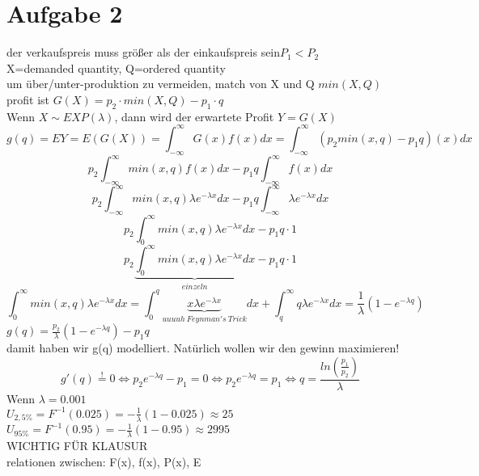 \documentclass{article}
\begin{document}
	\section{Aufgabe 2}
	der verkaufspreis muss größer als der einkaufspreis sein$P_1<P_2$\\
	X=demanded quantity, Q=ordered quantity\\
	um über/unter-produktion zu vermeiden, match von X und Q $min(X,Q)$\\
	profit ist $G(X)=p_2\cdot min(X,Q)-p_1\cdot q$\\
	Wenn $X\sim EXP(\lambda)$, dann wird der erwartete Profit
	$Y=G(X)$\\
	\[g(q) = EY = E(G(X)) = \int_{-\infty}^\infty G(x)f(x)dx = \int_{-\infty}^\infty (p_2min(x,q)-p_1q)(x)dx \]
	\[ p_2\int_{-\infty}^\infty min(x,q)f(x)dx-p_1q\int_{-\infty}^\infty f(x) dx\]
	\[ p_2\int_{-\infty}^\infty min(x,q)\lambda e^{-\lambda x}dx-p_1q\int_{-\infty}^\infty \lambda e^{-\lambda x} dx\]
	\[ p_2\int_{0}^\infty min(x,q)\lambda e^{-\lambda x}dx-p_1q\cdot 1\]
	\[ p_2\underbrace{\int_{0}^\infty min(x,q)\lambda e^{-\lambda x}dx}_{einzeln}-p_1q\cdot 1\]
	\[\int_{0}^\infty min(x,q)\lambda e^{-\lambda x}dx = \int_0^q\underbrace{x\lambda e^{-\lambda x}}_{uuuuh\ Feynman's\ Trick}dx+\int_q^\infty q\lambda e^{-\lambda x}dx =  \frac{1}{\lambda}(1-e^{-\lambda q})\]
	$g(q) = \frac{p_2}{\lambda}(1-e^{-\lambda q})-p_1q$\\
	damit haben wir g(q) modelliert. Natürlich wollen wir den gewinn maximieren!\\
	\[g'(q)\stackrel{!}{=} 0\iff p_2e^{-\lambda q}-p_1=0\iff p_2e^{-\lambda q}=p_1\iff q = \frac{ln(\frac{p_1}{p_2})}{\lambda}\]
	Wenn $\lambda =0.001$\\
	$U_{2,5\%} = F^{-1}(0.025) = -\frac{1}{\lambda}(1-0.025)\approx 25$\\
	$U_{95\%} = F^{-1}(0.95) = -\frac{1}{\lambda}(1-0.95)\approx 2995$\\
	WICHTIG FÜR KLAUSUR\\
	relationen zwischen: F(x), f(x), P(x), E
\end{document}
